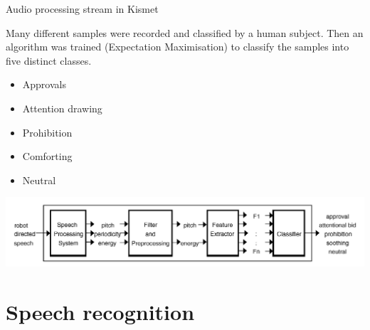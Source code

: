 \documentclass[compress]{beamer}
\begin{document}
\begin{frame}{Audio processing stream in Kismet}

    Many different samples were recorded and classified by a human subject.
    Then an algorithm was trained (Expectation Maximisation) to classify the
    samples into five distinct classes.

    \begin{itemize}
        \item Approvals
        \item Attention drawing
        \item Prohibition
        \item Comforting
        \item Neutral
    \end{itemize}

    \begin{center}
        \includegraphics[width=0.8\linewidth]{kismet-audio-processing}
    \end{center}

\end{frame}

\section{Speech recognition}
\end{document}
